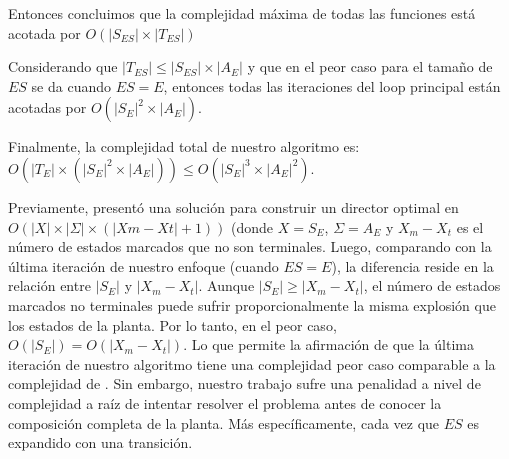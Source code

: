Entonces concluimos que la complejidad máxima de todas las funciones está acotada por $O(|S_{ES}| \times |T_{ES}|)$  

Considerando que $|T_{ES}| \leq|S_{ES}|\times|A_E|$ y que en el peor caso para el tamaño de $ES$ se da cuando $ES=E$, entonces todas las iteraciones del loop principal están acotadas por $O(|S_E|^2\times|A_E|)$.

Finalmente, la complejidad total de nuestro algoritmo es: $O(|T_E| \times (|S_E|^2 \times |A_E|)) \leq O(|S_E|^3 \times |A_E|^2)$.

Previamente, \cite{Huang:2007:Optimal}
presentó una solución para construir un director optimal en $O(|X| \times |\Sigma| × (|X m − X t | + 1))$ (donde $X=S_E$, $\Sigma = A_E$ y $X_m - X_t$ es el número de 
estados marcados que no son terminales. 
Luego, comparando \cite{Huang:2007:Optimal} 
con la última iteración de nuestro enfoque (cuando $ES=E$), la diferencia reside en la relación entre
$|S_E|$ y $|X_m - X_t|$. 
Aunque $|S_E| \geq |X_m - X_t|$, el número de estados marcados no terminales puede sufrir proporcionalmente la misma explosión que los estados de la planta.
Por lo tanto, en el peor caso, $O(|S_E|) = O(|X_m - X_t|)$. Lo que permite la afirmación de que la última iteración de nuestro algoritmo tiene una complejidad peor caso comparable a la complejidad de 
\cite{Huang:2007:Optimal}.
Sin embargo, nuestro trabajo sufre una penalidad a nivel de complejidad a raíz de intentar resolver el problema antes de conocer la composición completa de la planta. Más específicamente, cada vez que
$ES$ es expandido con una transición. 